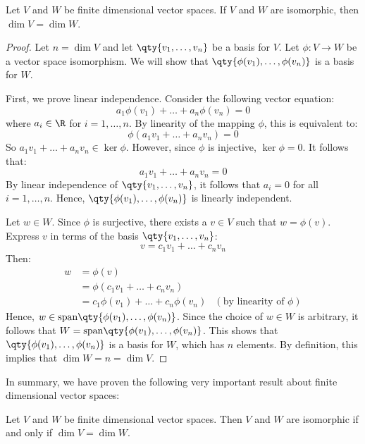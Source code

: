 \begin{proposition}
  Let \( V \) and \( W \) be finite dimensional vector spaces. If \( V \) and \( W \) are isomorphic, then \( \dim V=\dim W \).
\end{proposition}
\begin{proof}
  Let \( n=\dim V \) and let \( \qty{v_1,\dots,v_n} \) be a basis for \( V \). Let \( \phi:V\to W \) be a vector space isomorphism. We will show that \( \qty{\phi(v_1),\dots,\phi(v_n)} \) is a basis for \( W \).

  \vspace{3mm}

  First, we prove linear independence. Consider the following vector equation:
  \[ a_1\phi(v_1)+\dots+a_n\phi(v_n)=0 \]
  where \( a_i\in\R \) for \( i=1,\dots, n \). By linearity of the mapping \( \phi \), this is equivalent to:
  \[ \phi(a_1v_1+\dots+a_nv_n)=0 \]
  So \( a_1v_1+\dots+a_nv_n\in\ker\phi \). However, since \( \phi \) is injective, \( \ker\phi=\qty{0} \). It follows that:
  \[ a_1v_1+\dots+a_nv_n=0 \]
  By linear independence of \( \qty{v_1,\dots,v_n} \), it follows that \( a_i=0 \) for all \( i=1,\dots,n \). Hence, \( \qty{\phi(v_1),\dots,\phi(v_n)} \) is linearly independent.

  \vspace{3mm}

  Let \( w\in W \). Since \( \phi \) is surjective, there exists a \( v\in V \) such that \( w=\phi(v) \). Express \( v \) in terms of the basis \( \qty{v_1,\dots,v_n} \):
  \[ v=c_1v_1+\dots+c_nv_n \]
  Then:
  \begin{align*}
    w&= \phi(v)\\
    &= \phi(c_1v_1+\dots+c_nv_n)\\
    &= c_1\phi(v_1)+\dots+c_n\phi(v_n) &(\text{by linearity of }\phi)
  \end{align*}
  Hence, \( w\in\text{span}\qty{\phi(v_1),\dots,\phi(v_n)} \). Since the choice of \( w\in W \) is arbitrary, it follows that \( W=\text{span}\qty{\phi(v_1),\dots,\phi(v_n)} \). This shows that \( \qty{\phi(v_1),\dots,\phi(v_n)} \) is a basis for \( W \), which has \( n \) elements. By definition, this implies that \( \dim W=n=\dim V \).
\end{proof}

In summary, we have proven the following very important result about finite dimensional vector spaces:
\begin{theorem}
  Let \( V \) and \( W \) be finite dimensional vector spaces. Then \( V \) and \( W \) are isomorphic if and only if \( \dim V=\dim W \).
\end{theorem}

